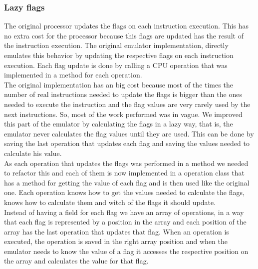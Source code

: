 \subsubsection{Lazy flags}
The original processor updates the flags on each instruction execution. This has no extra cost for the processor because this flags are updated has the result of the instruction execution. The original emulator implementation, directly emulates this behavior by updating the respective flags on each instruction execution. Each flag update is done by calling a CPU operation that was implemented in a method for each operation.\\
\indent The original implementation has an big cost because most of the times the number of real instructions needed to update the flags is bigger than the ones needed to execute the instruction and the flag values are very rarely used by the next instructions. So, most of the work performed was in vague.
We improved this part of the emulator by calculating the flags in a lazy way, that is, the emulator never calculates the flag values until they are used. This can be done by saving the last operation that updates each flag and saving the values needed to calculate his value.\\
\indent As each operation that updates the flags was performed in a method we needed to refactor this and each of them is now implemented in a operation class that has a method for getting the value of each flag and is then used like the original one. Each operation knows how to get the values needed to calculate the flags, knows how to calculate them and witch of the flags it should update.\\
\indent Instead of having a field for each flag we have an array of operations, in a way that each flag is represented by a position in the array and each position of the array has the last operation that updates that flag. When an operation is executed, the operation is saved in the right array position and when the emulator needs to know the value of a flag it accesses the respective position on the array and calculates the value for that flag.

